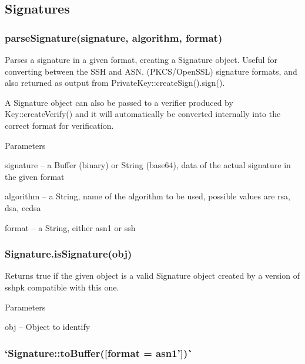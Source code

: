 \subsection*{Signatures}

\subsubsection*{{\ttfamily parse\+Signature(signature, algorithm, format)}}

Parses a signature in a given format, creating a {\ttfamily Signature} object. Useful for converting between the S\+SH and A\+S\+N. (P\+K\+C\+S/\+Open\+S\+SL) signature formats, and also returned as output from {\ttfamily Private\+Key\+::create\+Sign().sign()}.

A Signature object can also be passed to a verifier produced by {\ttfamily Key\+::create\+Verify()} and it will automatically be converted internally into the correct format for verification.

Parameters


\begin{DoxyItemize}
\item {\ttfamily signature} -- a Buffer (binary) or String (base64), data of the actual signature in the given format
\item {\ttfamily algorithm} -- a String, name of the algorithm to be used, possible values are {\ttfamily rsa}, {\ttfamily dsa}, {\ttfamily ecdsa}
\item {\ttfamily format} -- a String, either {\ttfamily asn1} or {\ttfamily ssh}
\end{DoxyItemize}

\subsubsection*{{\ttfamily Signature.\+is\+Signature(obj)}}

Returns {\ttfamily true} if the given object is a valid {\ttfamily Signature} object created by a version of {\ttfamily sshpk} compatible with this one.

Parameters


\begin{DoxyItemize}
\item {\ttfamily obj} -- Object to identify
\end{DoxyItemize}

\subsubsection*{`Signature\+::to\+Buffer(\mbox{[}format = \textquotesingle{}asn1'\mbox{]})\`{}}

